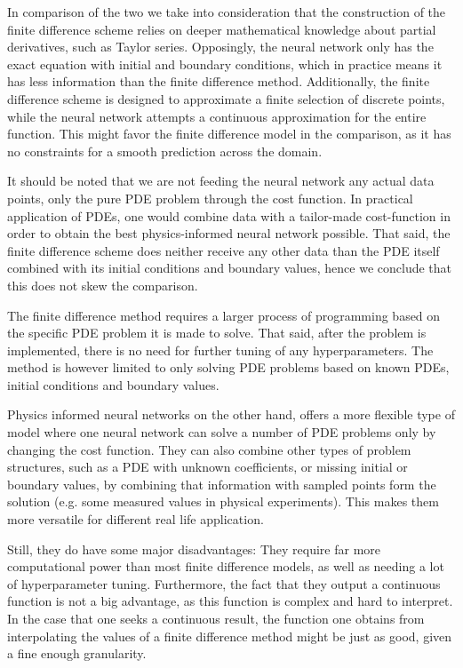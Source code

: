 In comparison of the two we take into consideration that the construction of the finite difference scheme relies on deeper mathematical knowledge about partial derivatives, such as Taylor series.
Opposingly, the neural network only has the exact equation with initial and boundary conditions, which in practice means it has less information than the finite difference method.
Additionally, the finite difference scheme is designed to approximate a finite selection of discrete points, while the neural network attempts a continuous approximation for the entire function. This might favor the finite difference model in the comparison, as it has no constraints for a smooth prediction across the domain. 

It should be noted that we are not feeding the neural network any actual data points, only the pure PDE problem through the cost function.
In practical application of PDEs, one would combine data with a tailor-made cost-function in order to obtain the best physics-informed neural network possible.
That said, the finite difference scheme does neither receive any other data than the PDE itself combined with its initial conditions and boundary values, hence we conclude that this does not skew the comparison.

The finite difference method requires a larger process of programming based on the specific PDE problem it is made to solve.
That said, after the problem is implemented, there is no need for further tuning of any hyperparameters.
The method is however limited to only solving PDE problems based on known PDEs, initial conditions and boundary values.

Physics informed neural networks on the other hand, offers a more flexible type of model where one neural network can solve a number of PDE problems only by changing the cost function.
They can also combine other types of problem structures, such as a PDE with unknown coefficients, or missing initial or boundary values, by combining that information with sampled points form the solution (e.g. some measured values in physical experiments).
This makes them more versatile for different real life application.

Still, they do have some major disadvantages: They require far more computational power than most finite difference models, as well as needing a lot of hyperparameter tuning.
Furthermore, the fact that they output a continuous function is not a big advantage, as this function is complex and hard to interpret.
In the case that one seeks a continuous result, the function one obtains from interpolating the values of a finite difference method might be just as good, given a fine enough granularity. 
